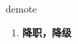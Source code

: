 
\begin{frame}
{\huge demote}
\begin{center}
\begin{enumerate}\Large
  \item \textbf{降职，降级}
\end{enumerate}
\end{center}
\end{frame}
